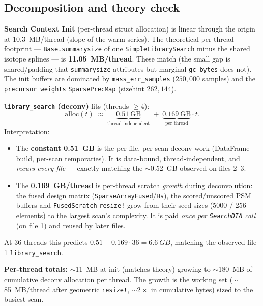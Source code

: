 \documentclass[11pt]{article}
\begin{document}
\subsection{Decomposition and theory check}
\textbf{Search Context Init} (per-thread struct allocation) is linear through the
origin at \SI{10.3}{MB/thread} (slope of the warm series). The theoretical per-thread
footprint --- \texttt{Base.summarysize} of one \texttt{SimpleLibrarySearch} minus the
shared isotope splines --- is \textbf{\SI{11.05}{MB/thread}}. These match (the small
gap is shared/padding that \texttt{summarysize} attributes but marginal \texttt{gc\_bytes}
does not). The init buffers are dominated by \texttt{mass\_err\_samples}
($250{,}000$ samples) and the \texttt{precursor\_weights} \texttt{SparsePrecMap}
(sizehint $262{,}144$).

\textbf{\texttt{library\_search} (deconv)} fits (threads $\ge 4$):
\begin{equation}
\text{alloc}(t) \;\approx\; \underbrace{0.51\ \text{GB}}_{\text{thread-independent}}
\;+\; \underbrace{0.169\ \text{GB}}_{\text{per thread}} \cdot t .
\end{equation}
Interpretation:
\begin{itemize}
  \item The \textbf{constant \SI{0.51}{GB}} is the per-file, per-scan deconv work
        (DataFrame build, per-scan temporaries). It is data-bound, thread-independent,
        and \emph{recurs every file} --- exactly matching the $\sim$\SI{0.52}{GB}
        observed on files 2--3.
  \item The \textbf{\SI{0.169}{GB/thread}} is per-thread scratch \emph{growth} during
        deconvolution: the fused design matrix (\texttt{SparseArrayFused}/\texttt{Hs}),
        the scored/unscored PSM buffers and \texttt{FusedScratch} \texttt{resize!}-grow
        from their seed sizes (5000 / 256 elements) to the largest scan's complexity.
        It is paid \emph{once per \texttt{SearchDIA} call} (on file 1) and reused by
        later files.
\end{itemize}
At 36 threads this predicts $0.51 + 0.169\cdot 36 = \SI{6.6}{GB}$, matching the observed
file-1 \texttt{library\_search}.

\textbf{Per-thread totals:} $\sim$\SI{11}{MB} at init (matches theory) growing to
$\sim$\SI{180}{MB} of cumulative deconv allocation per thread. The growth is the
working set ($\sim$\SI{85}{MB}/thread after geometric \texttt{resize!}, $\sim 2\times$
in cumulative bytes) sized to the busiest scan.
\end{document}
